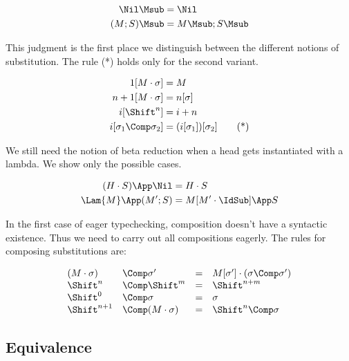 
\begin{align*} 
\Nil\Msub &= \Nil\\
(M;S)\Msub &= M\Msub;S\Msub
\end{align*} 

\bigskip 

This judgment is the first place we distinguish between 
the different notions of substitution.  The rule (*)
holds only for the second variant.

\begin{align*} 
1[M\cdot\sigma] &= M\\
n+1[M\cdot\sigma] &= n[\sigma]\\
i[\Shift^n] &= i+n\\
i[\sigma_1\Comp\sigma_2] &= (i[\sigma_1])[\sigma_2]\tag{*}
\end{align*} 

We still need the notion of beta reduction when a 
head gets instantiated with a lambda.  We show
only the possible cases.

\bigskip 
{}

\begin{align*} 
(H\cdot S)\App\Nil &= H\cdot S\\
\Lam{M}\App(M';S) &= M[M'\cdot\IdSub]\App S
\end{align*} 

In the first case of eager typechecking, composition doesn't
have a syntactic existence.  Thus we need to carry out all 
compositions eagerly.  The rules for composing substitutions are:

\bigskip 
{}

$$
\begin{array}{llll}
(M\cdot \sigma) & \Comp \sigma' &= &M[\sigma']\cdot (\sigma\Comp\sigma') \\
\Shift^n & \Comp \Shift^m &= &\Shift^{n+m}\\
\Shift^0 & \Comp \sigma &= &\sigma\\
\Shift^{n+1}&\Comp (M\cdot\sigma) &= &\Shift^n\Comp\sigma
\end{array} 
$$


\subsection{Equivalence} 

